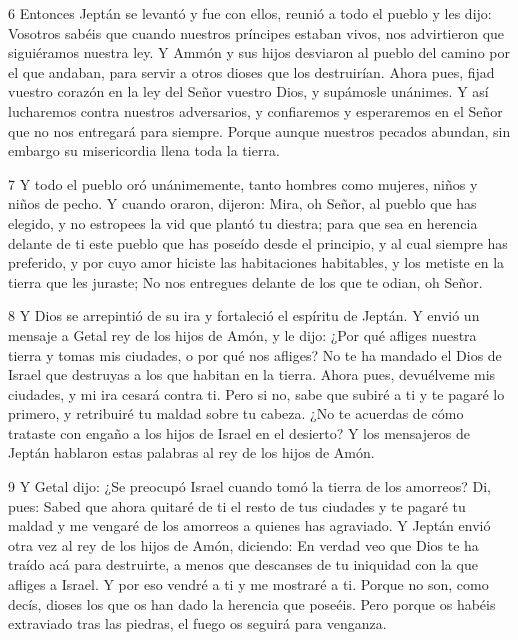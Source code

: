 \par 6 Entonces Jeptán se levantó y fue con ellos, reunió a todo el pueblo y les dijo: Vosotros sabéis que cuando nuestros príncipes estaban vivos, nos advirtieron que siguiéramos nuestra ley. Y Ammón y sus hijos desviaron al pueblo del camino por el que andaban, para servir a otros dioses que los destruirían. Ahora pues, fijad vuestro corazón en la ley del Señor vuestro Dios, y supámosle unánimes. Y así lucharemos contra nuestros adversarios, y confiaremos y esperaremos en el Señor que no nos entregará para siempre. Porque aunque nuestros pecados abundan, sin embargo su misericordia llena toda la tierra.

\par 7 Y todo el pueblo oró unánimemente, tanto hombres como mujeres, niños y niños de pecho. Y cuando oraron, dijeron: Mira, oh Señor, al pueblo que has elegido, y no estropees la vid que plantó tu diestra; para que sea en herencia delante de ti este pueblo que has poseído desde el principio, y al cual siempre has preferido, y por cuyo amor hiciste las habitaciones habitables, y los metiste en la tierra que les juraste; No nos entregues delante de los que te odian, oh Señor.

\par 8 Y Dios se arrepintió de su ira y fortaleció el espíritu de Jeptán. Y envió un mensaje a Getal rey de los hijos de Amón, y le dijo: ¿Por qué afliges nuestra tierra y tomas mis ciudades, o por qué nos afliges? No te ha mandado el Dios de Israel que destruyas a los que habitan en la tierra. Ahora pues, devuélveme mis ciudades, y mi ira cesará contra ti. Pero si no, sabe que subiré a ti y te pagaré lo primero, y retribuiré tu maldad sobre tu cabeza. ¿No te acuerdas de cómo trataste con engaño a los hijos de Israel en el desierto? Y los mensajeros de Jeptán hablaron estas palabras al rey de los hijos de Amón.

\par 9 Y Getal dijo: ¿Se preocupó Israel cuando tomó la tierra de los amorreos? Di, pues: Sabed que ahora quitaré de ti el resto de tus ciudades y te pagaré tu maldad y me vengaré de los amorreos a quienes has agraviado. Y Jeptán envió otra vez al rey de los hijos de Amón, diciendo: En verdad veo que Dios te ha traído acá para destruirte, a menos que descanses de tu iniquidad con la que afliges a Israel. Y por eso vendré a ti y me mostraré a ti. Porque no son, como decís, dioses los que os han dado la herencia que poseéis. Pero porque os habéis extraviado tras las piedras, el fuego os seguirá para venganza.

